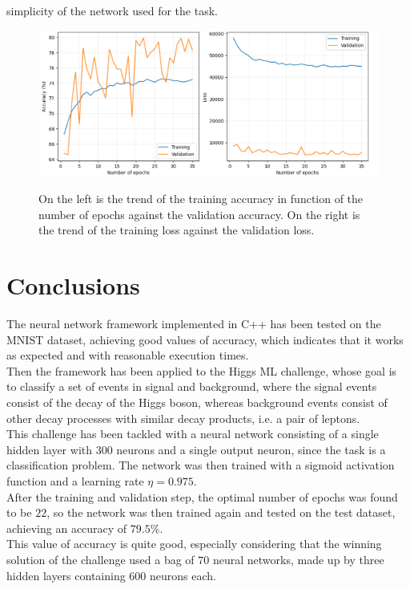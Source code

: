 \documentclass[12pt]{article}
\begin{document}
simplicity of the network used for the task.
\begin{figure}
  \centering
  \includegraphics[scale=0.45]{./img/training_validation.png}
  \label{tv}
  \caption{On the left is the trend of the training accuracy in function of the number of epochs against the
  validation accuracy. On the right is the trend of the training loss against the validation loss.}
\end{figure}
\pagebreak

\section{Conclusions}
The neural network framework implemented in C++ has been tested on the MNIST dataset, achieving good values
of accuracy, which indicates that it works as expected and with reasonable execution times. \\
Then the framework has been applied to the Higgs ML challenge, whose goal is to classify a set of events
in signal and background, where the signal events consist of the decay of the Higgs boson, whereas 
background events consist of other decay processes with similar decay products, i.e. a pair of leptons. \\
This challenge has been tackled with a neural network consisting of a single hidden layer with $300$
neurons and a single output neuron, since the task is a classification problem. The network was then 
trained with a sigmoid activation function and a learning rate $\eta = 0.975$. \\
After the training and validation step, the optimal number of epochs was found to be $22$, so the network
was then trained again and tested on the test dataset, achieving an accuracy of $79.5 \%$. \\
This value of accuracy is quite good, especially considering that the winning solution of the challenge
used a bag of $70$ neural networks, made up by three hidden layers containing $600$ neurons each.
\pagebreak

\printbibliography
\end{document}
